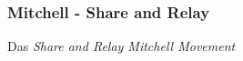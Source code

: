 \subsubsection{Mitchell - Share and Relay}

\noindent
Das \textit{Share and Relay Mitchell Movement}
